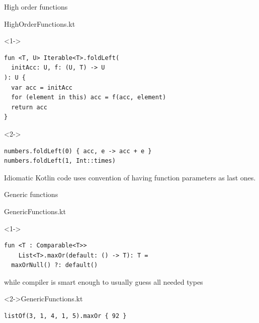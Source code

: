\documentclass[hyperref={pdfpagelabels=false},xcolor={dvipsnames},compress]{beamer}
\begin{document}
    \begin{frame}[fragile]{High order functions}
        \begin{exampleblock}{HighOrderFunctions.kt}
            \begin{onlyenv}<1->
                \begin{lstlisting}
fun <T, U> Iterable<T>.foldLeft(
  initAcc: U, f: (U, T) -> U
): U {
  var acc = initAcc
  for (element in this) acc = f(acc, element)
  return acc
}
                \end{lstlisting}
            \end{onlyenv}
            \begin{onlyenv}<2->
                \begin{lstlisting}
numbers.foldLeft(0) { acc, e -> acc + e }
numbers.foldLeft(1, Int::times)
                \end{lstlisting}
            \end{onlyenv}
        \end{exampleblock}
        Idiomatic Kotlin code uses convention of having function parameters as last ones.
    \end{frame}

    \begin{frame}[fragile]{Generic functions}
        \begin{exampleblock}{GenericFunctions.kt}
            \begin{onlyenv}<1->
                \begin{lstlisting}
fun <T : Comparable<T>>
    List<T>.maxOr(default: () -> T): T =
  maxOrNull() ?: default()
                \end{lstlisting}
            \end{onlyenv}
        \end{exampleblock}
        while compiler is smart enough to usually guess all needed types
        \begin{exampleblock}
            <2->{GenericFunctions.kt}
            \begin{onlyenv}
                \begin{lstlisting}
listOf(3, 1, 4, 1, 5).maxOr { 92 }
                \end{lstlisting}
            \end{onlyenv}
        \end{exampleblock}
    \end{frame}
\end{document}
